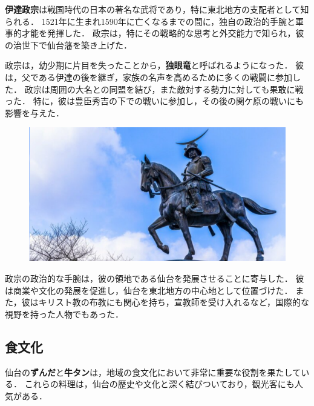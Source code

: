 \textbf{伊達政宗}は戦国時代の日本の著名な武将であり，特に東北地方の支配者として知られる．
1521年に生まれ1590年に亡くなるまでの間に，独自の政治的手腕と軍事的才能を発揮した．
政宗は，特にその戦略的な思考と外交能力で知られ，彼の治世下で仙台藩を築き上げた．

政宗は，幼少期に片目を失ったことから，\textbf{独眼竜}と呼ばれるようになった．
彼は，父である伊達の後を継ぎ，家族の名声を高めるために多くの戦闘に参加した．
政宗は周囲の大名との同盟を結び，また敵対する勢力に対しても果敢に戦った．
特に，彼は豊臣秀吉の下での戦いに参加し，その後の関ケ原の戦いにも影響を与えた．

\begin{figure}[H]
	\centering
	\includegraphics[width=0.6\linewidth]{img/datemasamunezou}
	\label{fig:datemasamunezou}
\end{figure}

政宗の政治的な手腕は，彼の領地である仙台を発展させることに寄与した．
彼は商業や文化の発展を促進し，仙台を東北地方の中心地として位置づけた．
また，彼はキリスト教の布教にも関心を持ち，宣教師を受け入れるなど，国際的な視野を持った人物でもあった．
\newpage

\subsection*{食文化}

仙台の\textbf{ずんだ}と\textbf{牛タン}は，地域の食文化において非常に重要な役割を果たしている．
これらの料理は，仙台の歴史や文化と深く結びついており，観光客にも人気がある．

